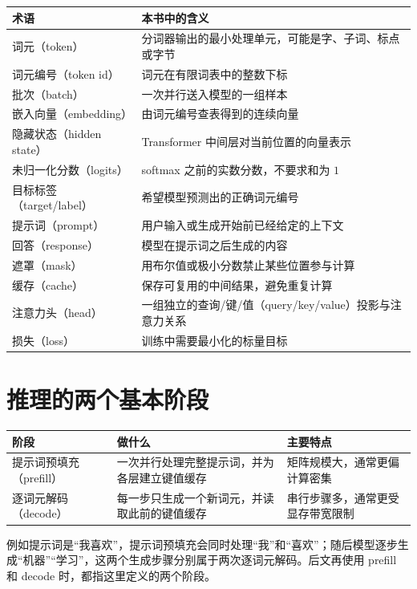 \documentclass[UTF8,zihao=-4,openany,fontset=fandol]{ctexbook}
\begin{document}
\begin{center}
\begin{tabularx}{0.94\textwidth}{lY}
\toprule
术语 & 本书中的含义\\
\midrule
词元（token） & 分词器输出的最小处理单元，可能是字、子词、标点或字节\\
词元编号（token id） & 词元在有限词表中的整数下标\\
批次（batch） & 一次并行送入模型的一组样本\\
嵌入向量（embedding） & 由词元编号查表得到的连续向量\\
隐藏状态（hidden state） & Transformer 中间层对当前位置的向量表示\\
未归一化分数（logits） & softmax 之前的实数分数，不要求和为 $1$\\
目标标签（target/label） & 希望模型预测出的正确词元编号\\
提示词（prompt） & 用户输入或生成开始前已经给定的上下文\\
回答（response） & 模型在提示词之后生成的内容\\
遮罩（mask） & 用布尔值或极小分数禁止某些位置参与计算\\
缓存（cache） & 保存可复用的中间结果，避免重复计算\\
注意力头（head） & 一组独立的查询/键/值（query/key/value）投影与注意力关系\\
损失（loss） & 训练中需要最小化的标量目标\\
\bottomrule
\end{tabularx}
\end{center}

\section*{推理的两个基本阶段}

\begin{center}
\begin{tabularx}{0.94\textwidth}{lYY}
\toprule
阶段 & 做什么 & 主要特点\\
\midrule
提示词预填充（prefill） & 一次并行处理完整提示词，并为各层建立键值缓存 & 矩阵规模大，通常更偏计算密集\\
逐词元解码（decode） & 每一步只生成一个新词元，并读取此前的键值缓存 & 串行步骤多，通常更受显存带宽限制\\
\bottomrule
\end{tabularx}
\end{center}

例如提示词是“我喜欢”，提示词预填充会同时处理“我”和“喜欢”；随后模型逐步生成“机器”“学习”，这两个生成步骤分别属于两次逐词元解码。后文再使用 prefill 和 decode 时，都指这里定义的两个阶段。

\mainmatter













\backmatter

\end{document}
